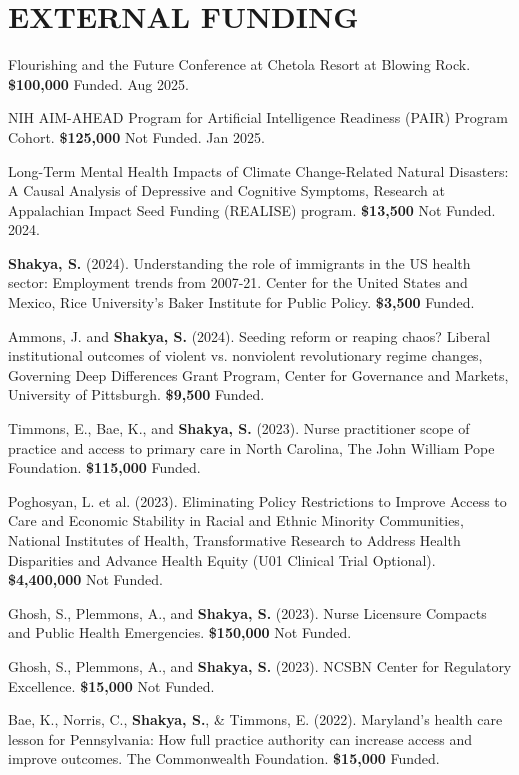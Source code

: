 \section*{EXTERNAL FUNDING}
\begin{etaremune}
\item Flourishing and the Future Conference at Chetola Resort at Blowing Rock. \textbf{\$100,000} Funded. Aug 2025.
\item NIH AIM-AHEAD Program for Artificial Intelligence Readiness (PAIR) Program Cohort. \textbf{\$125,000} Not Funded. Jan 2025.
\item Long-Term Mental Health Impacts of Climate Change-Related Natural Disasters: A Causal Analysis of Depressive and Cognitive Symptoms, Research at Appalachian Impact Seed Funding (REALISE) program. \textbf{\$13,500} Not Funded. 2024.
\item \textbf{Shakya, S.} (2024). Understanding the role of immigrants in the US health sector: Employment trends from 2007-21. Center for the United States and Mexico, Rice University's Baker Institute for Public Policy. \textbf{\$3,500} Funded.
\item Ammons, J. and \textbf{Shakya, S.} (2024). Seeding reform or reaping chaos? Liberal institutional outcomes of violent vs. nonviolent revolutionary regime changes, Governing Deep Differences Grant Program, Center for Governance and Markets, University of Pittsburgh. \textbf{\$9,500} Funded.
\item Timmons, E., Bae, K., and \textbf{Shakya, S.} (2023). Nurse practitioner scope of practice and access to primary care in North Carolina, The John William Pope Foundation. \textbf{\$115,000} Funded.
\item Poghosyan, L. et al. (2023). Eliminating Policy Restrictions to Improve Access to Care and Economic Stability in Racial and Ethnic Minority Communities, National Institutes of Health, Transformative Research to Address Health Disparities and Advance Health Equity (U01 Clinical Trial Optional). \textbf{\$4,400,000} Not Funded.
\item Ghosh, S., Plemmons, A., and \textbf{Shakya, S.} (2023). Nurse Licensure Compacts and Public Health Emergencies. \textbf{\$150,000} Not Funded.
\item Ghosh, S., Plemmons, A., and \textbf{Shakya, S.} (2023). NCSBN Center for Regulatory Excellence. \textbf{\$15,000} Not Funded.
\item Bae, K., Norris, C., \textbf{Shakya, S.}, \& Timmons, E. (2022). Maryland's health care lesson for Pennsylvania: How full practice authority can increase access and improve outcomes. The Commonwealth Foundation. \textbf{\$15,000} Funded.
\end{etaremune}

